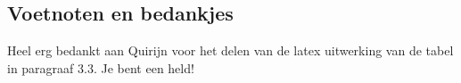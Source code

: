 \subsection{Voetnoten en bedankjes}
Heel erg bedankt aan Quirijn voor het delen van de latex uitwerking van de tabel in paragraaf 3.3. Je bent een held!
